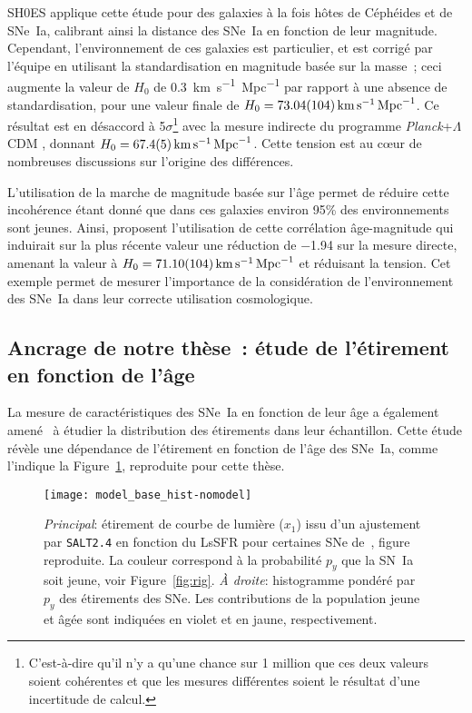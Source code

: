 \documentclass[../main/main.tex]{subfiles}
\begin{document}
SH0ES applique cette étude pour des galaxies à la fois hôtes de Céphéides et de
SNe~Ia, calibrant ainsi la distance des SNe~Ia en fonction de leur magnitude.
Cependant, l'environnement de ces galaxies est particulier, et est corrigé par
l'équipe en utilisant la standardisation en magnitude basée sur la masse~; ceci
augmente la valeur de $H_0$ de \SI{0.3}{km.s^{-1}.Mpc^{-1}} par rapport à une
absence de standardisation, pour une valeur finale de $H_0 =
\SI{73.04\pm1.04}{km.s^{-1}.Mpc^{-1}}$. Ce résultat est en désaccord à
5$\sigma$\footnote{C'est-à-dire qu'il n'y a qu'une chance sur 1 million que ces
    deux valeurs soient cohérentes et que les mesures différentes soient le
résultat d'une incertitude de calcul.} avec la mesure indirecte du programme
\textit{Planck}+$\Lambda$CDM \citep{planck2018}, donnant $H_0 =
\SI{67.4\pm0.5}{km.s^{-1}.Mpc^{-1}}$. Cette tension est au cœur de
nombreuses discussions sur l'origine des différences.

L'utilisation de la marche de magnitude basée sur l'âge permet de réduire cette
incohérence étant donné que dans ces galaxies environ 95\% des environnements
sont jeunes. Ainsi, \cite{rigault2015} proposent l'utilisation de cette
corrélation âge-magnitude qui induirait sur la plus récente valeur une réduction
de \num{-1.94} sur la mesure directe, amenant la valeur à $H_0 =
\SI{71.10\pm1.04}{km.s^{-1}.Mpc^{-1}}$ et réduisant la tension. Cet exemple
permet de mesurer l'importance de la considération de l'environnement des SNe~Ia
dans leur correcte utilisation cosmologique.

\subsection{Ancrage de notre thèse~: étude de l'étirement en fonction de
l'âge}\label{ssec:phdgoal}

La mesure de caractéristiques des SNe~Ia en fonction de leur âge a également
amené~\cite{rigault2020} à étudier la distribution des étirements dans leur
échantillon. Cette étude révèle une dépendance de l'étirement en fonction de
l'âge des SNe~Ia, comme l'indique la Figure~\ref{fig:x1lssfr}, reproduite pour
cette thèse.

\begin{figure}[ht]
    \centering
    \texttt{[image: model\_base\_hist-nomodel]}
    \caption[Dispersion de l'étirement en fonction du LsSFR]{\textit{Principal}:
        étirement de courbe de lumière ($x_1$) issu d'un ajustement par
        \textsc{\texttt{SALT2.4}} en fonction du LsSFR pour certaines SNe
        de~\cite{rigault2020}, figure reproduite. La couleur correspond à la
        probabilité $p_y$ que la SN~Ia soit jeune, voir Figure~\ref{fig:rig}.
        \textit{À droite}: histogramme pondéré par $p_y$ des étirements des SNe.
        Les contributions de la population jeune et âgée sont indiquées en
    violet et en jaune, respectivement.}
    \label{fig:x1lssfr}
\end{figure}
\end{document}
